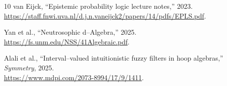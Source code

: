 \documentclass[11pt]{article}
\begin{document}
\begin{thebibliography}{10}
van Eijck, ``Epistemic probability logic lecture notes,'' 2023. \\
\url{https://staff.fnwi.uva.nl/d.j.n.vaneijck2/papers/14/pdfs/EPLS.pdf}.

Yan et al., ``Neutrosophic d--Algebra,'' 2025. \\
\url{https://fs.unm.edu/NSS/41Algebraic.pdf}.

Alali et al., ``Interval--valued intuitionistic fuzzy filters in hoop algebras,'' \emph{Symmetry}, 2025. \\
\url{https://www.mdpi.com/2073-8994/17/9/1411}.

\end{thebibliography}
\end{document}
